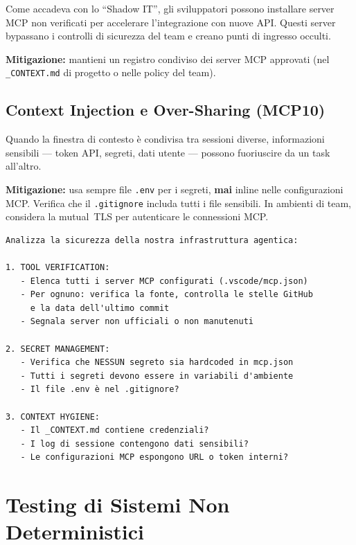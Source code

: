 Come accadeva con lo ``Shadow IT'', gli sviluppatori possono installare server MCP non verificati per accelerare l'integrazione con nuove API. Questi server bypassano i controlli di sicurezza del team e creano punti di ingresso occulti.

\textbf{Mitigazione:} mantieni un registro condiviso dei server MCP approvati (nel \texttt{\_CONTEXT.md} di progetto o nelle policy del team).

\subsection{Context Injection e Over-Sharing (MCP10)}

Quando la finestra di contesto è condivisa tra sessioni diverse, informazioni sensibili --- token API, segreti, dati utente --- possono fuoriuscire da un task all'altro.

\textbf{Mitigazione:} usa sempre file \texttt{.env} per i segreti, \textbf{mai} inline nelle configurazioni MCP. Verifica che il \texttt{.gitignore} includa tutti i file sensibili. In ambienti di team, considera la mutual~TLS per autenticare le connessioni MCP.

\begin{praticabox}[title={Pratica --- Audit di sicurezza agentica}]
\begin{lstlisting}[language={}]
Analizza la sicurezza della nostra infrastruttura agentica:

1. TOOL VERIFICATION:
   - Elenca tutti i server MCP configurati (.vscode/mcp.json)
   - Per ognuno: verifica la fonte, controlla le stelle GitHub
     e la data dell'ultimo commit
   - Segnala server non ufficiali o non manutenuti

2. SECRET MANAGEMENT:
   - Verifica che NESSUN segreto sia hardcoded in mcp.json
   - Tutti i segreti devono essere in variabili d'ambiente
   - Il file .env è nel .gitignore?

3. CONTEXT HYGIENE:
   - Il _CONTEXT.md contiene credenziali?
   - I log di sessione contengono dati sensibili?
   - Le configurazioni MCP espongono URL o token interni?
\end{lstlisting}
\end{praticabox}

\section{Testing di Sistemi Non Deterministici}

